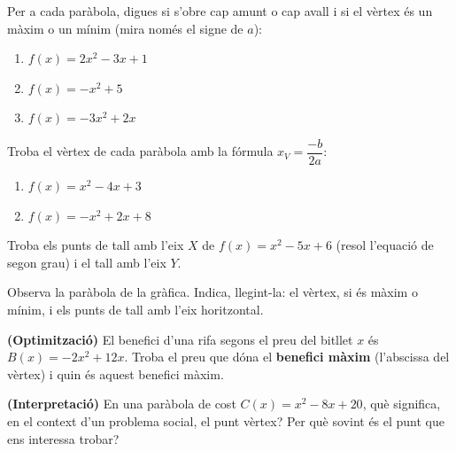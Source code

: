 \begin{exercicis}
\begin{exlist}
  \item Per a cada paràbola, digues si s'obre cap amunt o cap avall i si el vèrtex és
        un màxim o un mínim (mira només el signe de $a$):
    \begin{enumerate}[label=\alph*), leftmargin=1.6em, topsep=2pt]
      \item $f(x)=2x^2-3x+1$
      \item $f(x)=-x^2+5$
      \item $f(x)=-3x^2+2x$
    \end{enumerate}
  \item Troba el vèrtex de cada paràbola amb la fórmula $x_V=\dfrac{-b}{2a}$:
    \begin{enumerate}[label=\alph*), leftmargin=1.6em, topsep=2pt]
      \item $f(x)=x^2-4x+3$
      \item $f(x)=-x^2+2x+8$
    \end{enumerate}
  \item Troba els punts de tall amb l'eix $X$ de $f(x)=x^2-5x+6$ (resol l'equació de
        segon grau) i el tall amb l'eix $Y$.
  \item Observa la paràbola de la gràfica. Indica, llegint-la: el vèrtex, si és màxim
        o mínim, i els punts de tall amb l'eix horitzontal.

        \begin{center}

        \end{center}

  \item \textbf{(Optimització)} El benefici d'una rifa segons el preu del bitllet $x$
        és $B(x)=-2x^2+12x$. Troba el preu que dóna el \textbf{benefici màxim} (l'abscissa
        del vèrtex) i quin és aquest benefici màxim.
  \item \textbf{(Interpretació)} En una paràbola de cost $C(x)=x^2-8x+20$, què
        significa, en el context d'un problema social, el punt vèrtex? Per què sovint
        és el punt que ens interessa trobar?
\end{exlist}
\end{exercicis}

